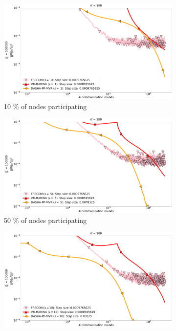 \documentclass[10pt]{article}
\begin{document}
\begin{figure}[H]
    \begin{subfigure}{.33\textwidth}
        \includegraphics[width=\textwidth]{neurips_2023_stochastic_mnist_nof_100_numnodes_10_probs_mega_batch_100000_batch_size_10_longer_number_of_workers_1.pdf}
        \caption{10 \% of nodes participating}
    \end{subfigure}
    \begin{subfigure}{.33\textwidth}
        \includegraphics[width=\textwidth]{neurips_2023_stochastic_mnist_nof_100_numnodes_10_probs_mega_batch_100000_batch_size_10_longer_number_of_workers_5.pdf}
        \caption{50 \% of nodes participating}
    \end{subfigure}
    \begin{subfigure}{.33\textwidth}
        \includegraphics[width=\textwidth]{neurips_2023_stochastic_mnist_nof_100_numnodes_10_probs_mega_batch_100000_batch_size_10_longer_number_of_workers_10.pdf}

\end{subfigure}
\end{figure}
\end{document}
